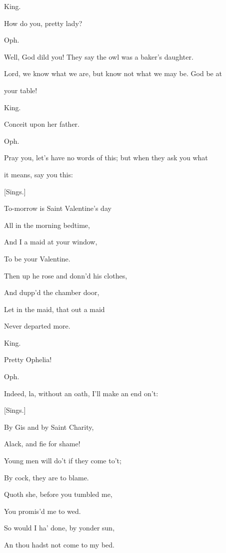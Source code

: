\documentclass[12pt]{book}
\begin{document}
King.

How do you, pretty lady?



Oph.

Well, God dild you! They say the owl was a baker's daughter.

Lord, we know what we are, but know not what we may be. God be at

your table!



King.

Conceit upon her father.



Oph.

Pray you, let's have no words of this; but when they ask you what

it means, say you this:

[Sings.]

   To-morrow is Saint Valentine's day

     All in the morning bedtime,

   And I a maid at your window,

     To be your Valentine.



   Then up he rose and donn'd his clothes,

     And dupp'd the chamber door,

   Let in the maid, that out a maid

     Never departed more.



King.

Pretty Ophelia!



Oph.

Indeed, la, without an oath, I'll make an end on't:

[Sings.]

   By Gis and by Saint Charity,

     Alack, and fie for shame!

   Young men will do't if they come to't;

     By cock, they are to blame.



   Quoth she, before you tumbled me,

     You promis'd me to wed.

   So would I ha' done, by yonder sun,

     An thou hadst not come to my bed.
\end{document}
